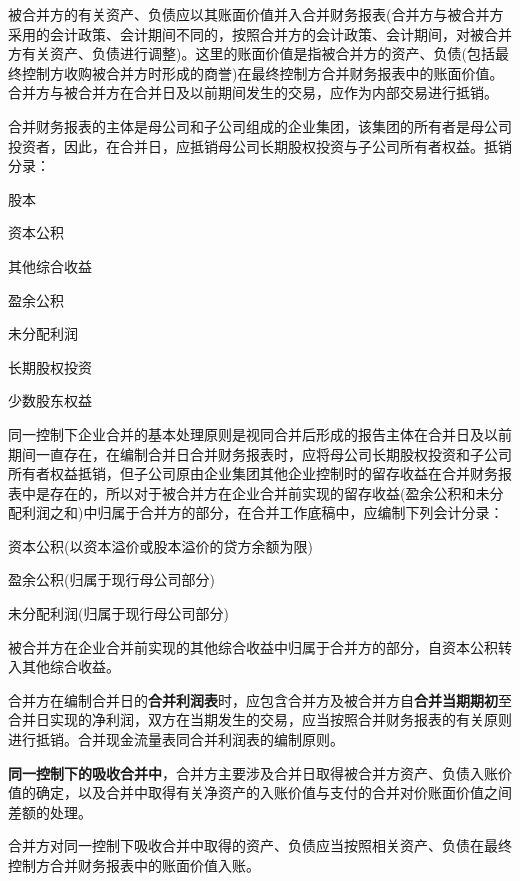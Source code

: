 \documentclass[UTF8,12pt]{ctexart}
\newenvironment{Dr}{%
	\begin{list}{}%
		{
			\setlength{\leftmargin}{2em}
			\setlength{\labelwidth}{2em}
			\setlength{\labelsep}{0pt}
			\setlength{\itemindent}{0pt}
			\setlength{\listparindent}{0pt}
			\setlength{\parsep}{0pt}
			\setlength{\topsep}{0pt}
		}
		\item[\textbf{借：}]
	}{%
	\end{list}
}
\newenvironment{Cr}{%
	\begin{list}{}%
		{
			\setlength{\leftmargin}{3em}
			\setlength{\labelwidth}{2em}
			\setlength{\labelsep}{0pt}
			\setlength{\itemindent}{0pt}
			\setlength{\listparindent}{0pt}
			\setlength{\parsep}{0pt}
			\setlength{\topsep}{0pt}
		}
		\item[\textbf{贷：}]
	}{%
	\end{list}
}
\numberwithin{equation}{section} %
\numberwithin{figure}{section}
\numberwithin{table}{section}
\begin{document}
	被合并方的有关资产、负债应以其账面价值并入合并财务报表(合并方与被合并方采用的会计政策、会计期间不同的，按照合并方的会计政策、会计期间，对被合并方有关资产、负债进行调整)。这里的账面价值是指被合并方的资产、负债(包括最终控制方收购被合并方时形成的商誉)在最终控制方合并财务报表中的账面价值。合并方与被合并方在合并日及以前期间发生的交易，应作为内部交易进行抵销。
	
	合并财务报表的主体是母公司和子公司组成的企业集团，该集团的所有者是母公司投资者，因此，在合并日，应抵销母公司长期股权投资与子公司所有者权益。抵销分录：
	\begin{Dr}
		股本
		
		资本公积
		
		其他综合收益
		
		盈余公积
		
		未分配利润
	\end{Dr}
	\begin{Cr}
		长期股权投资
		
		少数股东权益
	\end{Cr}
	
	同一控制下企业合并的基本处理原则是视同合并后形成的报告主体在合并日及以前期间一直存在，在编制合并日合并财务报表时，应将母公司长期股权投资和子公司所有者权益抵销，但子公司原由企业集团其他企业控制时的留存收益在合并财务报表中是存在的，所以对于被合并方在企业合并前实现的留存收益(盈余公积和未分配利润之和)中归属于合并方的部分，在合并工作底稿中，应编制下列会计分录：
	\begin{Dr}
		资本公积(以资本溢价或股本溢价的贷方余额为限)
	\end{Dr}
	\begin{Cr}
		盈余公积(归属于现行母公司部分)
		
		未分配利润(归属于现行母公司部分)
	\end{Cr}

	被合并方在企业合并前实现的其他综合收益中归属于合并方的部分，自资本公积转入其他综合收益。
	
	合并方在编制合并日的\textbf{合并利润表}时，应包含合并方及被合并方自\textbf{合并当期期初}至合并日实现的净利润，双方在当期发生的交易，应当按照合并财务报表的有关原则进行抵销。合并现金流量表同合并利润表的编制原则。
	
	\textbf{同一控制下的吸收合并中}，合并方主要涉及合并日取得被合并方资产、负债入账价值的确定，以及合并中取得有关净资产的入账价值与支付的合并对价账面价值之间差额的处理。
	
	合并方对同一控制下吸收合并中取得的资产、负债应当按照相关资产、负债在最终控制方合并财务报表中的账面价值入账。
	
\end{document}
